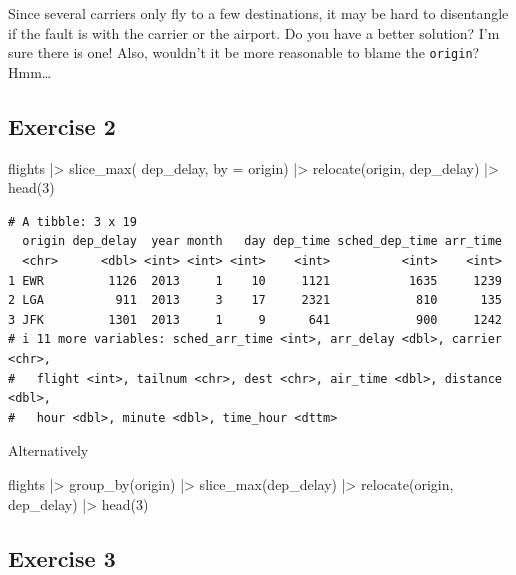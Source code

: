 \documentclass[
  letterpaper,
  DIV=11,
  numbers=noendperiod]{scrreprt}
\newenvironment{Shaded}{\begin{snugshade}}{\end{snugshade}}
\newcommand{\AttributeTok}[1]{\textcolor[rgb]{0.40,0.45,0.13}{#1}}
\newcommand{\DecValTok}[1]{\textcolor[rgb]{0.68,0.00,0.00}{#1}}
\newcommand{\FunctionTok}[1]{\textcolor[rgb]{0.28,0.35,0.67}{#1}}
\newcommand{\NormalTok}[1]{\textcolor[rgb]{0.00,0.23,0.31}{#1}}
\newcommand{\SpecialCharTok}[1]{\textcolor[rgb]{0.37,0.37,0.37}{#1}}
\begin{document}
Since several carriers only fly to a few destinations, it may be hard to
disentangle if the fault is with the carrier or the airport. Do you have
a better solution? I'm sure there is one! Also, wouldn't it be more
reasonable to blame the \texttt{origin}? Hmm\ldots{}

\subsection{Exercise 2}\label{exercise-2-9}

\begin{Shaded}
\begin{Highlighting}[]
\NormalTok{flights }\SpecialCharTok{|\textgreater{}}
  \FunctionTok{slice\_max}\NormalTok{(}
\NormalTok{    dep\_delay,}
    \AttributeTok{by =}\NormalTok{ origin) }\SpecialCharTok{|\textgreater{}}
  \FunctionTok{relocate}\NormalTok{(origin, dep\_delay) }\SpecialCharTok{|\textgreater{}}
  \FunctionTok{head}\NormalTok{(}\DecValTok{3}\NormalTok{)}
\end{Highlighting}
\end{Shaded}

\begin{verbatim}
# A tibble: 3 x 19
  origin dep_delay  year month   day dep_time sched_dep_time arr_time
  <chr>      <dbl> <int> <int> <int>    <int>          <int>    <int>
1 EWR         1126  2013     1    10     1121           1635     1239
2 LGA          911  2013     3    17     2321            810      135
3 JFK         1301  2013     1     9      641            900     1242
# i 11 more variables: sched_arr_time <int>, arr_delay <dbl>, carrier <chr>,
#   flight <int>, tailnum <chr>, dest <chr>, air_time <dbl>, distance <dbl>,
#   hour <dbl>, minute <dbl>, time_hour <dttm>
\end{verbatim}

Alternatively

\begin{Shaded}
\begin{Highlighting}[]
\NormalTok{flights }\SpecialCharTok{|\textgreater{}}
\FunctionTok{group\_by}\NormalTok{(origin) }\SpecialCharTok{|\textgreater{}}
  \FunctionTok{slice\_max}\NormalTok{(dep\_delay) }\SpecialCharTok{|\textgreater{}}
  \FunctionTok{relocate}\NormalTok{(origin, dep\_delay) }\SpecialCharTok{|\textgreater{}}
  \FunctionTok{head}\NormalTok{(}\DecValTok{3}\NormalTok{)}
\end{Highlighting}
\end{Shaded}

\subsection{Exercise 3}\label{exercise-3-8}
\end{document}
